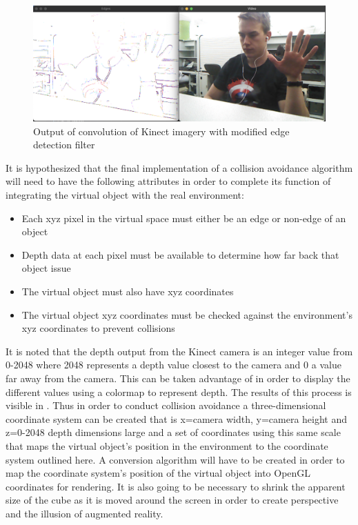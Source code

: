 \begin{figure}[h]
    \centering
    \includegraphics[width=0.9\linewidth]{figures/kinect_filter_edges.png}
    \caption{Output of convolution of Kinect imagery with modified edge detection filter}
    \label{fig:kinect_filter_edges}
\end{figure}

It is hypothesized that the final implementation of a collision avoidance algorithm will need to have the following attributes in order to complete its function of integrating the virtual object with the real environment:

\begin{itemize}
  \item Each xyz pixel in the virtual space must either be an edge or non-edge of an object
  \item Depth data at each pixel must be available to determine how far back that object issue
  \item The virtual object must also have xyz coordinates
  \item The virtual object xyz coordinates must be checked against the environment's xyz coordinates to prevent collisions
\end{itemize}

It is noted that the depth output from the Kinect camera is an integer value from 0-2048 where 2048 represents a depth value closest to the camera and 0 a value far away from the camera. This can be taken advantage of in order to display the different values using a colormap to represent depth. The results of this process is visible in . Thus in order to conduct collision avoidance a three-dimensional coordinate system can be created that is x=camera width, y=camera height and z=0-2048 depth dimensions large and a set of coordinates using this same scale that maps the virtual object's position in the environment to the coordinate system outlined here. A conversion algorithm will have to be created in order to map the coordinate system's position of the virtual object into OpenGL coordinates for rendering. It is also going to be necessary to shrink the apparent size of the cube as it is moved around the screen in order to create perspective and the illusion of augmented reality.

